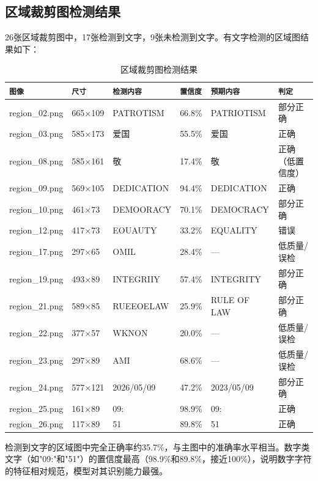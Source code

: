 \documentclass[12pt,hyperref,a4paper,UTF8]{ctexart}
\begin{document}
\subsection{区域裁剪图检测结果}

26张区域裁剪图中，17张检测到文字，9张未检测到文字。有文字检测的区域图结果如下：

\begin{table}[!htbp]
    \centering
    \small
    \begin{tabular}{l|l|l|l|l|l}
        \hline
        \texttt{图像} & \texttt{尺寸} & \texttt{检测内容} & \texttt{置信度} & \texttt{预期内容} & \texttt{判定} \\
        \hline
        region\_02.png & 665×109 & PATROTISM & 66.8\% & PATRIOTISM & 部分正确 \\
        region\_03.png & 585×173 & 爱国 & 55.5\% & 爱国 & 正确 \\
        region\_08.png & 585×161 & 敬 & 17.4\% & 敬 & 正确（低置信度） \\
        region\_09.png & 569×105 & DEDICATION & 94.4\% & DEDICATION & 正确 \\
        region\_10.png & 461×73 & DEMOORACY & 70.1\% & DEMOCRACY & 部分正确 \\
        region\_12.png & 417×73 & EOUAUTY & 33.2\% & EQUALITY & 错误 \\
        region\_17.png & 297×65 & OMIL & 28.4\% & — & 低质量/误检 \\
        region\_19.png & 493×89 & INTEGRIIY & 57.4\% & INTEGRITY & 部分正确 \\
        region\_21.png & 589×85 & RUEEOELAW & 25.9\% & RULE OF LAW & 部分正确 \\
        region\_22.png & 377×57 & WKNON & 20.0\% & — & 低质量/误检 \\
        region\_23.png & 297×89 & AMI & 68.6\% & — & 低质量/误检 \\
        region\_24.png & 577×121 & 2026/05/09 & 47.2\% & 2023/05/09 & 部分正确 \\
        region\_25.png & 161×89 & 09: & 98.9\% & 09: & 正确 \\
        region\_26.png & 117×89 & 51 & 89.8\% & 51 & 正确 \\
        \hline
    \end{tabular}
    \caption{区域裁剪图检测结果}
    \label{tab:region_results}
\end{table}

检测到文字的区域图中完全正确率约35.7\%，与主图中的准确率水平相当。数字类文字（如"09:"和"51"）的置信度最高（98.9\%和89.8\%，接近100\%），说明数字字符的特征相对规范，模型对其识别能力最强。
\end{document}
